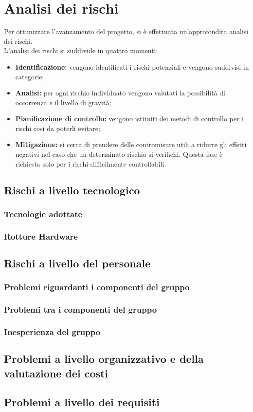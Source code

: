 \section{Analisi dei rischi}
Per ottimizzare l'avanzamento del progetto, si è effettuata un'approfondita analisi dei
rischi. \\
L'analisi dei rischi si suddivide in quattro momenti:
\begin{itemize}
	\item \textbf{Identificazione:} vengono identificati i rischi potenziali e vengono suddivisi in categorie; \\
	\item \textbf{Analisi:} per ogni rischio individuato vengono valutati la possibilità di occorrenza e il livello di gravità; \\
	\item \textbf{Pianificazione di controllo:} vengono istituiti dei metodi di controllo per i rischi così da poterli evitare; \\
	\item \textbf{Mitigazione:} si cerca di prendere delle contromisure utili a ridurre gli effetti negativi nel caso che un determinato rischio si verifichi. Questa fase è richiesta solo per i rischi difficilmente controllabili. \\
\end{itemize}
	\subsection{Rischi a livello tecnologico}
		\subsubsection{Tecnologie adottate}
		\subsubsection{Rotture Hardware}
	\subsection{Rischi a livello del personale}
		\subsubsection{Problemi riguardanti i componenti del gruppo}
		\subsubsection{Problemi tra i componenti del gruppo}
		\subsubsection{Inesperienza del gruppo}
	\subsection{Problemi a livello organizzativo e della valutazione dei costi}
	\subsection{Problemi a livello dei requisiti}